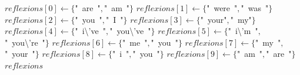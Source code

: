 \documentclass[a4paper,10pt]{article}
\begin{document}
\begin{algorithm}
\caption{setupReflexions()}
\begin{algorithmic}[5]

\STATE {}
  \STATE \(reflexions[0]\gets\{\)"{}\ are\ "{}\(,\)"{}\ am\ "{}\(\}\)
  \STATE \(reflexions[1]\gets\{\)"{}\ were\ "{}\(,\)"{}\ was\ "{}\(\}\)
  \STATE \(reflexions[2]\gets\{\)"{}\ you\ "{}\(,\)"{}\ I\ "{}\(\}\)
  \STATE \(reflexions[3]\gets\{\)"{}\ your"{}\(,\)"{}\ my"{}\(\}\)
  \STATE \(reflexions[4]\gets\{\)"{}\ i\textbackslash{}'{}ve\ "{}\(,\)"{}\ you\textbackslash{}'{}ve\ "{}\(\}\)
  \STATE \(reflexions[5]\gets\{\)"{}\ i\textbackslash{}'{}m\ "{}\(,\)"{}\ you\textbackslash{}'{}re\ "{}\(\}\)
  \STATE \(reflexions[6]\gets\{\)"{}\ me\ "{}\(,\)"{}\ you\ "{}\(\}\)
  \STATE \(reflexions[7]\gets\{\)"{}\ my\ "{}\(,\)"{}\ your\ "{}\(\}\)
  \STATE \(reflexions[8]\gets\{\)"{}\ i\ "{}\(,\)"{}\ you\ "{}\(\}\)
  \STATE \(reflexions[9]\gets\{\)"{}\ am\ "{}\(,\)"{}\ are\ "{}\(\}\)
  \RETURN\(reflexions\)

\end{algorithmic}
\end{algorithm}
\end{document}
